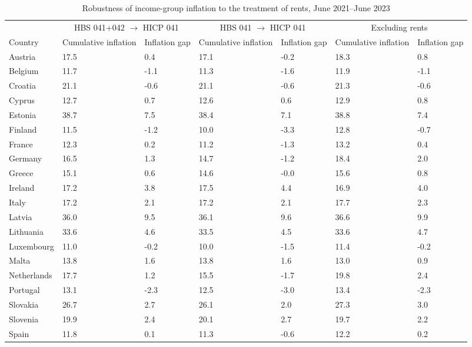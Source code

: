 \begin{table}[H]
\scriptsize
\setlength{\tabcolsep}{2.5pt}
\renewcommand{\arraystretch}{1.05}

\caption{\label{tab:rent-mapping-robustness}Robustness of income-group inflation to the treatment of rents, June 2021--June 2023}
\centering
\begin{tabular}[t]{lllllll}
\toprule
 & \multicolumn{2}{c}{HBS 041+042 $\to$ HICP 041} & \multicolumn{2}{c}{HBS 041 $\to$ HICP 041} & \multicolumn{2}{c}{Excluding rents}\\
\cmidrule(lr){2-3} \cmidrule(lr){4-5} \cmidrule(lr){6-7}
Country & Cumulative inflation & Inflation gap & Cumulative inflation & Inflation gap & Cumulative inflation & Inflation gap\\
\midrule
Austria & 17.5 & 0.4 & 17.1 & -0.2 & 18.3 & 0.8\\
Belgium & 11.7 & -1.1 & 11.3 & -1.6 & 11.9 & -1.1\\
Croatia & 21.1 & -0.6 & 21.1 & -0.6 & 21.3 & -0.6\\
Cyprus & 12.7 & 0.7 & 12.6 & 0.6 & 12.9 & 0.8\\
Estonia & 38.7 & 7.5 & 38.4 & 7.1 & 38.8 & 7.4\\
\addlinespace
Finland & 11.5 & -1.2 & 10.0 & -3.3 & 12.8 & -0.7\\
France & 12.3 & 0.2 & 11.2 & -1.3 & 13.2 & 0.4\\
Germany & 16.5 & 1.3 & 14.7 & -1.2 & 18.4 & 2.0\\
Greece & 15.1 & 0.6 & 14.6 & -0.0 & 15.6 & 0.8\\
Ireland & 17.2 & 3.8 & 17.5 & 4.4 & 16.9 & 4.0\\
\addlinespace
Italy & 17.2 & 2.1 & 17.2 & 2.1 & 17.7 & 2.3\\
Latvia & 36.0 & 9.5 & 36.1 & 9.6 & 36.6 & 9.9\\
Lithuania & 33.6 & 4.6 & 33.5 & 4.5 & 33.6 & 4.7\\
Luxembourg & 11.0 & -0.2 & 10.0 & -1.5 & 11.4 & -0.2\\
Malta & 13.8 & 1.6 & 13.8 & 1.6 & 13.0 & 0.9\\
\addlinespace
Netherlands & 17.7 & 1.2 & 15.5 & -1.7 & 19.8 & 2.4\\
Portugal & 13.1 & -2.3 & 12.5 & -3.0 & 13.4 & -2.3\\
Slovakia & 26.7 & 2.7 & 26.1 & 2.0 & 27.3 & 3.0\\
Slovenia & 19.9 & 2.4 & 20.1 & 2.7 & 19.7 & 2.2\\
Spain & 11.8 & 0.1 & 11.3 & -0.6 & 12.2 & 0.2\\

\end{tabular}
\end{table}
